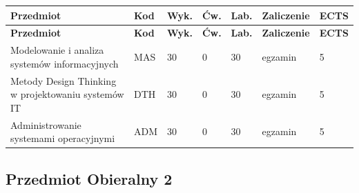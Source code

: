 \documentclass[12pt,a4paper]{article}
\newcommand{\thdrule}{\noalign{\global\setlength{\extrarowheight}{0pt}}}
\newcommand{\thdend}{\noalign{\global\setlength{\extrarowheight}{4pt}}}
\begin{document}
{\scriptsize
\begin{longtable}{m{5.5cm}m{0.8cm}m{1cm}m{1cm}m{1cm}m{1.7cm}m{0.7cm}}
\thdrule\toprule
\rowcolor{pjatkRed}
{\color{white}\footnotesize\textbf{\vphantom{Ag}Przedmiot}} & {\color{white}\footnotesize\textbf{\vphantom{Ag}Kod}} & {\color{white}\footnotesize\textbf{\vphantom{Ag}Wyk.}} & {\color{white}\footnotesize\textbf{\vphantom{Ag}Ćw.}} & {\color{white}\footnotesize\textbf{\vphantom{Ag}Lab.}} & {\color{white}\footnotesize\textbf{\vphantom{Ag}Zaliczenie}} & {\color{white}\footnotesize\textbf{\vphantom{Ag}ECTS}} \\
\midrule\thdend
\endfirsthead
\thdrule\toprule
\rowcolor{pjatkRed}
{\color{white}\footnotesize\textbf{\vphantom{Ag}Przedmiot}} & {\color{white}\footnotesize\textbf{\vphantom{Ag}Kod}} & {\color{white}\footnotesize\textbf{\vphantom{Ag}Wyk.}} & {\color{white}\footnotesize\textbf{\vphantom{Ag}Ćw.}} & {\color{white}\footnotesize\textbf{\vphantom{Ag}Lab.}} & {\color{white}\footnotesize\textbf{\vphantom{Ag}Zaliczenie}} & {\color{white}\footnotesize\textbf{\vphantom{Ag}ECTS}} \\
\midrule\thdend
\endhead
\rowcolor{tableRowLight} Modelowanie i analiza systemów informacyjnych & MAS & 30 & 0 & 30 & {\scriptsize egzamin} & 5 \\
\rowcolor{tableRowAlt} Metody Design Thinking w projektowaniu systemów IT & DTH & 30 & 0 & 30 & {\scriptsize egzamin} & 5 \\
\rowcolor{tableRowLight} Administrowanie systemami operacyjnymi & ADM & 30 & 0 & 30 & {\scriptsize egzamin} & 5 \\
\bottomrule
\end{longtable}}

\subsection*{Przedmiot Obieralny 2}
\end{document}
